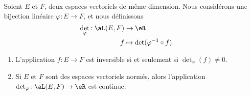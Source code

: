 \begin{proposition}	\label{PROPooQCPJooFSzaPc}
	Soient \( E\) et \( F\), deux espaces vectoriels de même dimension. Nous considérons une bijection linéaire \(\varphi \colon E\to F  \), et nous définissons
	\begin{equation}
		\begin{aligned}
			\det_{\varphi}\colon \aL(E,F) & \to \eR                            \\
			f                             & \mapsto \det(\varphi^{-1}\circ f).
		\end{aligned}
	\end{equation}
	\begin{enumerate}
		\item		\label{ITEMooERPIooBvkAPo}
		      L'application \(f \colon E\to F  \) est inversible si et seulement si \( \det_{\varphi}(f)\neq 0\).
		\item		\label{ITEMooTLJEooKyPOVs}
		      Si \( E\) et \( F\) sont des espaces vectoriels normés, alors l'application \(\det_{\varphi} \colon \aL(E,F)\to \eR  \) est continue.
	\end{enumerate}
\end{proposition}

